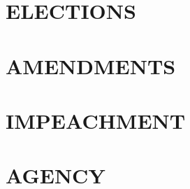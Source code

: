 \documentclass{article}
\begin{document}
\subsection{}
\section{ELECTIONS}
\subsection{}
\subsection{}
\section{AMENDMENTS}
\subsection{}
\subsection{}
\section{IMPEACHMENT}
\subsection{}
\subsection{}
\subsection{}
\subsection{}
\section{AGENCY}
\subsection{}
\end{document}

